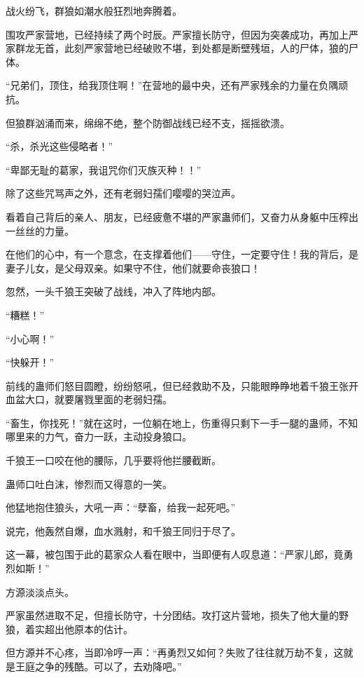 
\begin{this_body}



战火纷飞，群狼如潮水般狂烈地奔腾着。

围攻严家营地，已经持续了两个时辰。严家擅长防守，但因为突袭成功，再加上严家群龙无首，此刻严家营地已经破败不堪，到处都是断壁残垣，人的尸体，狼的尸体。

“兄弟们，顶住，给我顶住啊！”在营地的最中央，还有严家残余的力量在负隅顽抗。

但狼群汹涌而来，绵绵不绝，整个防御战线已经不支，摇摇欲溃。

“杀，杀光这些侵略者！”

“卑鄙无耻的葛家，我诅咒你们灭族灭种！！”

除了这些咒骂声之外，还有老弱妇孺们嘤嘤的哭泣声。

看着自己背后的亲人、朋友，已经疲惫不堪的严家蛊师们，又奋力从身躯中压榨出一丝丝的力量。

在他们的心中，有一个意念，在支撑着他们——守住，一定要守住！我的背后，是妻子儿女，是父母双亲。如果守不住，他们就要命丧狼口！

忽然，一头千狼王突破了战线，冲入了阵地内部。

“糟糕！”

“小心啊！”

“快躲开！”

前线的蛊师们怒目圆瞪，纷纷怒吼，但已经救助不及，只能眼睁睁地着千狼王张开血盆大口，就要屠戮里面的老弱妇孺。

“畜生，你找死！”就在这时，一位躺在地上，伤重得只剩下一手一腿的蛊师，不知哪里来的力气，奋力一跃，主动投身狼口。

千狼王一口咬在他的腰际，几乎要将他拦腰截断。

蛊师口吐白沫，惨烈而又得意的一笑。

他猛地抱住狼头，大吼一声：“孽畜，给我一起死吧。”

说完，他轰然自爆，血水溅射，和千狼王同归于尽了。

这一幕，被包围于此的葛家众人看在眼中，当即便有人叹息道：“严家儿郎，竟勇烈如斯！”

方源淡淡点头。

严家虽然进取不足，但擅长防守，十分团结。攻打这片营地，损失了他大量的野狼，着实超出他原本的估计。

但方源并不心疼，当即冷哼一声：“再勇烈又如何？失败了往往就万劫不复，这就是王庭之争的残酷。可以了，去劝降吧。”


\end{this_body}

